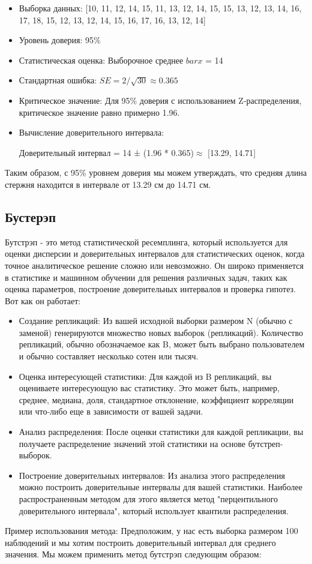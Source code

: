 \documentclass[specialist,
               substylefile = spbu_report.rtx,
               subf,href,colorlinks=true, 12pt]{disser}
\begin{document}
\begin{itemize}
    \item Выборка данных: [10, 11, 12, 14, 15, 11, 13, 12, 14, 15, 15, 13, 12, 13, 14, 16, 17, 18, 15, 12, 13, 12, 14, 15, 16, 17, 16, 13, 12, 14]
    \item Уровень доверия: 95\%
    \item Статистическая оценка: Выборочное среднее $bar{x}$ = 14
    \item Стандартная ошибка: $SE = 2 / \sqrt{30} \approx 0.365$
    \item Критическое значение: Для 95\% доверия с использованием Z-распределения, критическое значение равно примерно 1.96.
    \item Вычисление доверительного интервала: 
    
    Доверительный интервал = 14 ± (1.96 * 0.365)$ \approx $ [13.29, 14.71]
    \end{itemize}
    Таким образом, с 95\% уровнем доверия мы можем утверждать, что средняя длина стержня находится в интервале от 13.29 см до 14.71 см.

\subsection{Бустерэп}
Бутстрэп - это метод статистической ресемплинга, который используется для оценки дисперсии и доверительных интервалов для статистических оценок, когда точное аналитическое решение сложно или невозможно. Он широко применяется в статистике и машинном обучении для решения различных задач, таких как оценка параметров, построение доверительных интервалов и проверка гипотез. Вот как он работает:
\begin{itemize}
    \item Создание репликаций: Из вашей исходной выборки размером N (обычно с заменой) генерируются множество новых выборок (репликаций). Количество репликаций, обычно обозначаемое как B, может быть выбрано пользователем и обычно составляет несколько сотен или тысяч.
    \item Оценка интересующей статистики: Для каждой из B репликаций, вы оцениваете интересующую вас статистику. Это может быть, например, среднее, медиана, доля, стандартное отклонение, коэффициент корреляции или что-либо еще в зависимости от вашей задачи.
    \item Анализ распределения: После оценки статистики для каждой репликации, вы получаете распределение значений этой статистики на основе бутстреп-выборок.
    \item Построение доверительных интервалов: Из анализа этого распределения можно построить доверительные интервалы для вашей статистики. Наиболее распространенным методом для этого является метод "перцентильного доверительного интервала", который использует квантили распределения.
\end{itemize}
Пример использования метода:
\newline
Предположим, у нас есть выборка размером 100 наблюдений и мы хотим построить доверительный интервал для среднего значения. Мы можем применить метод бутстрэп следующим образом:
\end{document}
